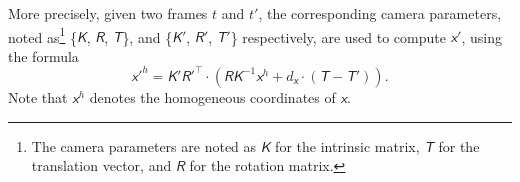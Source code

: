 \documentclass[notitlepage,english]{hgbreport}
\renewcommand{\vec}[1]{\bm{\mathsfit{#1}}}
\newcommand{\mat}[1]{\bm{\mathsfit{#1}}}
\newcommand{\Transpose}[1]{#1^{\top}}
\newcommand{\Inverse}[1]{#1^{-1}}
\begin{document}
More precisely, given two frames $t$ and $t'$, the corresponding camera parameters, noted as\footnote{The camera parameters are noted as $\mat K$ for the intrinsic matrix, $\mat T$ for the translation vector, and $\mat R$ for the rotation matrix.} \{$\vec K$, $\vec R$, $\vec T$\},  and \{$\vec{K'}$, $\vec{R'}$, $\vec{T'}$\} respectively, are used to compute $\vec{x'}$, using the formula
$$
\vec{x'}^h = \mat{K'}\Transpose{\mat{R'}}\cdot\left(
\mat R\Inverse{\mat K}\vec x^h + 
d_{\vec x}\cdot\left( \vec T - \vec{T'} \right) \right).$$
Note that $\vec x^h$ denotes the homogeneous coordinates of $\vec x$.


\MakeBibliography[nosplit]
\end{document}
